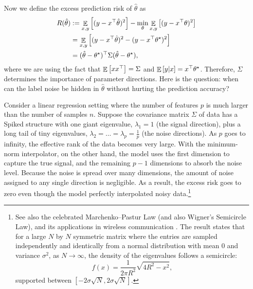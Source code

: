 Now we define the excess prediction risk of $\hat \theta$ as
\begin{align*}
    R(\hat \theta) &:= \mathop{\mathbb{E}}_{x, y}\left[ (y - x^{\top} \hat \theta)^2 \right] - \min_{\theta} \mathop{\mathbb{E}}_{x, y}\left[ (y - x^{\top} \theta)^2 \right] \\
    & = \mathop{\mathbb{E}}_{x, y}\left[  (y - x^{\top} \hat \theta)^2 - (y - x^{\top} \theta^{\star})^2  \right] \\
    & = (\hat \theta - \theta^{\star})^{\top} \Sigma (\hat \theta - \theta^{\star}),
\end{align*}
where we are using the fact that $\mathop{\mathbb{E}}\left[ xx^{\top} \right] = \Sigma$ and $\mathop{\mathbb{E}}\left[ y | x \right] = x^{\top}\theta^{\star}$.
Therefore, $\Sigma$ determines the importance of parameter directions.
Here is the question: when can the label noise be hidden in $\hat\theta$ without hurting the prediction accuracy?

\begin{example}
    Consider a linear regression setting where the number of features $p$ is much larger than the number of samples $n$.
    Suppose the covariance matrix $\Sigma$ of data has a Spiked structure with one giant eigenvalue, $\lambda_1 = 1$ (the signal direction), plus a long tail of tiny eigenvalues, $\lambda_2 = \dots = \lambda_p = \frac{1}{p}$ (the noise directions).
    As $p$ goes to infinity, the effective rank of the data becomes very large.
    With the minimum-norm interpolator, on the other hand, the model uses the first dimension to capture the true signal, and the remaining $p - 1$ dimensions to absorb the noise level.
    Because the noise is spread over many dimensions, the amount of noise assigned to any single direction is negligible.
    As a result, the excess risk goes to zero even though the model perfectly interpolated noisy data.\footnote{See also the celebrated Marchenko--Pastur Law (and also Wigner's Semicircle Law), and its applications in wireless communication \citep{tulino2004random}. The result states that for a large $N$ by $N$ symmetric matrix where the entries are sampled independently and identically from a normal distribution with mean $0$ and variance $\sigma^2$, as $N \rightarrow \infty$, the density of the eigenvalues follows a semicircle:
    \[ f(x) = \frac 1 {2\pi R^2} \sqrt{4 R^2 - x^2}, \] supported between $[-2\sigma \sqrt{N}, 2 \sigma \sqrt{N}]$.}
\end{example}

